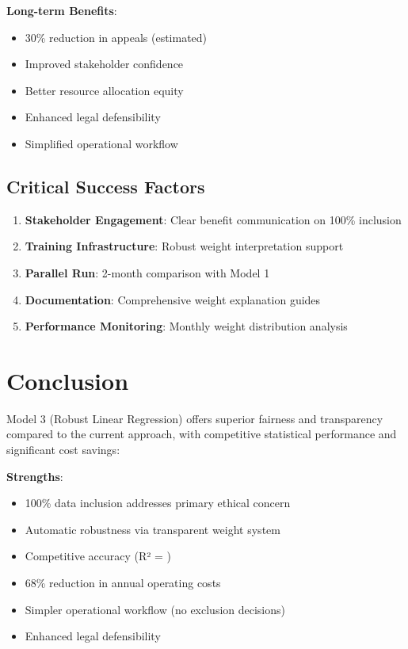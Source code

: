 \textbf{Long-term Benefits}:
\begin{itemize}
    \item 30\% reduction in appeals (estimated)
    \item Improved stakeholder confidence
    \item Better resource allocation equity
    \item Enhanced legal defensibility
    \item Simplified operational workflow
\end{itemize}

\subsection{Critical Success Factors}

\begin{enumerate}
    \item \textbf{Stakeholder Engagement}: Clear benefit communication on 100\% inclusion
    \item \textbf{Training Infrastructure}: Robust weight interpretation support
    \item \textbf{Parallel Run}: 2-month comparison with Model 1
    \item \textbf{Documentation}: Comprehensive weight explanation guides
    \item \textbf{Performance Monitoring}: Monthly weight distribution analysis
\end{enumerate}

\section{Conclusion}

Model 3 (Robust Linear Regression) offers superior fairness and transparency compared to the current approach, with competitive statistical performance and significant cost savings:

\textbf{Strengths}:
\begin{itemize}
    \item 100\% data inclusion addresses primary ethical concern
    \item Automatic robustness via transparent weight system
    \item Competitive accuracy (R² = \ModelThreeRSquaredTest{})
    \item 68\% reduction in annual operating costs
    \item Simpler operational workflow (no exclusion decisions)
    \item Enhanced legal defensibility
\end{itemize}

